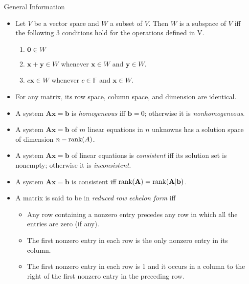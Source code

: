 \documentclass[../Notes.tex]{subfiles}
\begin{document}
    \begin{stbox}{General Information}
        \begin{itemize}
            \item  Let \(V\) be a vector space and \(W\) a subset of \(V\). Then \(W\) is a subspace of \(V\) iff the following 3 conditions hold for the operations defined in V.
            \begin{enumerate}[label=(\alph*)]
                \item \(\mathbf{0} \in W\) \label{Theorem 1.3(a)}
                \item \(\mathbf{x}+\mathbf{y} \in W\) whenever \(\mathbf{x} \in W\) and \(\mathbf{y} \in W\). \label{Theorem 1.3(b)}
                \item \(c\mathbf{x} \in W\) whenever \(c \in \mathbb{F}\) and \(\mathbf{x} \in W\). \label{Theorem 1.3(c)}
            \end{enumerate}
            \item For any matrix, its row space, column space, and dimension are identical.
            \item A system \(\mathbf{A}\mathbf{x}=\mathbf{b}\) is \emph{homogeneous} iff \(\mathbf{b}=0\); otherwise it is \emph{nonhomogeneous}.
            \item A system \(\mathbf{A}\mathbf{x}=\mathbf{b}\) of \(m\) linear equations in \(n\) unknowns has a solution space of dimension \(n-\operatorname{rank}(A)\).
            \item A system \(\mathbf{A}\mathbf{x}=\mathbf{b}\) of linear equations is \emph{consistent} iff its solution set is nonempty; otherwise it is \emph{inconsistent}.
            \item A system \(\mathbf{A}\mathbf{x}=\mathbf{b}\) is consistent iff \(\operatorname{rank}(\mathbf{A})=\operatorname{rank}(\mathbf{A}\vert \mathbf{b})\).
            \item A matrix is said to be in \emph{reduced row echelon form} iff
            \begin{itemize}
                \item Any row containing a nonzero entry precedes any row in which all the entries are zero (if any).
                \item The first nonzero entry in each row is the only nonzero entry in its column.
                \item The first nonzero entry in each row is 1 and it occurs in a column to the right of the first nonzero entry in the preceding row.
            \end{itemize}

\end{itemize}
\end{stbox}
\end{document}
